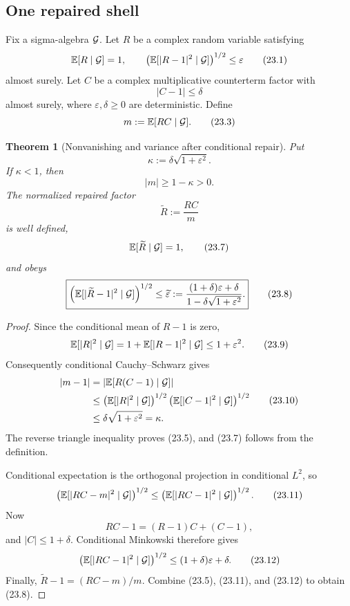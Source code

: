 \documentclass[11pt]{article}
\newtheorem{theorem}{Theorem}[section]
\theoremstyle{remark}
\begin{document}
\subsection{One repaired shell}

Fix a sigma-algebra \({\cal G}\).  Let \(R\) be a complex random
variable satisfying
\[
 {\mathbb E}[R\mid{\cal G}]=1,\qquad
 \left({\mathbb E}[|R-1|^2\mid{\cal G}]\right)^{1/2}
 \le\varepsilon                                             \tag{23.1}
\]
almost surely.  Let \(C\) be a complex multiplicative counterterm
factor with
\[
                         |C-1|\le\delta                     \tag{23.2}
\]
almost surely, where \(\varepsilon,\delta\ge0\) are deterministic.
Define
\[
                         m:={\mathbb E}[RC\mid{\cal G}].     \tag{23.3}
\]

\begin{theorem}[Nonvanishing and variance after conditional repair]
\label{thm:v12v23-one-shell}
Put
\[
                         \kappa:=\delta\sqrt{1+\varepsilon^2}.
                                                               \tag{23.4}
\]
If \(\kappa<1\), then
\[
                         |m|\ge1-\kappa>0.                  \tag{23.5}
\]
The normalized repaired factor
\[
                         \widetilde R:=\frac{RC}{m}          \tag{23.6}
\]
is well defined,
\[
 {\mathbb E}[\widetilde R\mid{\cal G}]=1,                  \tag{23.7}
\]
and obeys
\[
 \boxed{
 \left(
 {\mathbb E}[|\widetilde R-1|^2\mid{\cal G}]
 \right)^{1/2}
 \le
 \widetilde\varepsilon:=
 \frac{(1+\delta)\varepsilon+\delta}
      {1-\delta\sqrt{1+\varepsilon^2}}.}                   \tag{23.8}
\]
\end{theorem}

\begin{proof}
Since the conditional mean of \(R-1\) is zero,
\[
 {\mathbb E}[|R|^2\mid{\cal G}]
 =
 1+{\mathbb E}[|R-1|^2\mid{\cal G}]
 \le1+\varepsilon^2.                                       \tag{23.9}
\]
Consequently conditional Cauchy--Schwarz gives
\[
\begin{split}
 |m-1|
 &=
 \left|
 {\mathbb E}[R(C-1)\mid{\cal G}]
 \right|\\
 &\le
 \left({\mathbb E}[|R|^2\mid{\cal G}]\right)^{1/2}
 \left({\mathbb E}[|C-1|^2\mid{\cal G}]\right)^{1/2}\\
 &\le\delta\sqrt{1+\varepsilon^2}=\kappa.
\end{split}                                                  \tag{23.10}
\]
The reverse triangle inequality proves (23.5), and (23.7) follows
from the definition.

Conditional expectation is the orthogonal projection in conditional
\(L^2\), so
\[
 \left(
 {\mathbb E}[|RC-m|^2\mid{\cal G}]
 \right)^{1/2}
 \le
 \left(
 {\mathbb E}[|RC-1|^2\mid{\cal G}]
 \right)^{1/2}.                                             \tag{23.11}
\]
Now
\[
                         RC-1=(R-1)C+(C-1),
\]
and \(|C|\le1+\delta\).  Conditional Minkowski therefore gives
\[
 \left(
 {\mathbb E}[|RC-1|^2\mid{\cal G}]
 \right)^{1/2}
 \le(1+\delta)\varepsilon+\delta.                           \tag{23.12}
\]
Finally,
\(\widetilde R-1=(RC-m)/m\).  Combine (23.5),
(23.11), and (23.12) to obtain (23.8).
\end{proof}
\end{document}
